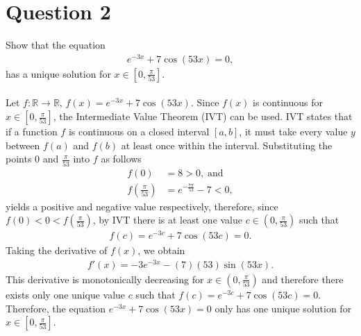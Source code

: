 \documentclass{amsart}
\begin{document}
\section*{\LARGE{Question 2}}
	Show that the equation
		\begin{align*}
			e^{-3x} + 7 \cos(53x) = 0,
		\end{align*}
		has a unique solution for $x \in \left[0, \frac{\pi}{53}\right]$.
		\\ \\
		Let $f:\mathbb{R} \to \mathbb{R},\,f(x) = e^{-3x} + 7 \cos(53x)$. Since $f(x)$ is continuous for $x \in [0, \frac{\pi}{53}]$, the Intermediate Value Theorem (IVT) can be used. IVT states that if a function $f$ is continuous on a closed interval $[a,b]$, it must take every value $y$ between $f(a)$ and $f(b)$ at least once within the interval. Substituting the points 0 and $\frac{\pi}{53}$ into $f$ as follows
		\begin{align*}
			f(0) &= 8 > 0,\; \text{and}	\\
			f(\frac{\pi}{53}) &= e^{-\frac{7\pi}{53}} - 7 < 0,
		\end{align*}
		yields a positive and negative value respectively, therefore, since $f(0) < 0 < f(\frac{\pi}{53})$, by IVT there is at least one value $c \in (0,\frac{\pi}{53})$ such that
		\begin{align*}
			f(c) = e^{-3c} + 7 \cos(53c) = 0.
		\end{align*}
		Taking the derivative of $f(x)$, we obtain
			\begin{align*}
				f'(x) = -3e^{-3x} - (7) (53) \sin(53x).
			\end{align*}
		This derivative is monotonically decreasing for $x \in \left(0, \frac{\pi}{53}\right)$ and therefore there exists only one unique value $c$ such that $f(c) = e^{-3c} + 7 \cos(53c) = 0$. Therefore, the equation $e^{-3x} + 7 \cos(53x) = 0$ only has one unique solution for $x \in [0, \frac{\pi}{53}]$.
		\\

\newpage
\end{document}
